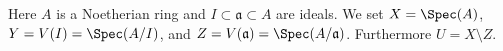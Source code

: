 \begin{situation}
\label{situation-algebraize}
Here $A$ is a Noetherian ring and $I \subset \mathfrak a \subset A$ are ideals.
We set $X = \Spec(A)$, $Y = V(I) = \Spec(A/I)$, and
$Z = V(\mathfrak a) = \Spec(A/\mathfrak a)$. Furthermore $U = X \setminus Z$.
\end{situation}